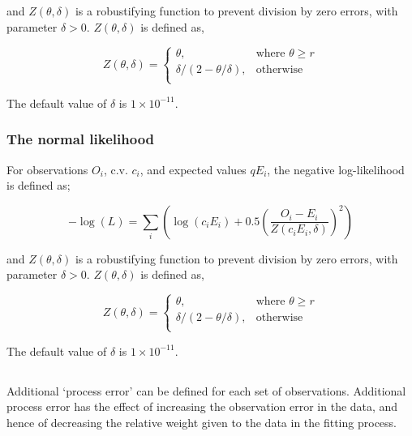 {{and $Z \left(\theta,\delta \right)$ is a robustifying function to prevent division by zero errors, with parameter $\delta>0$. $Z \left(\theta,\delta \right)$ is defined as,

\begin{equation}
   Z \left(\theta,\delta \right) = \begin{cases}
	  \theta, & \text{where $\theta \ge r$} \\
	  \delta/\left( 2-\theta/\delta \right), & \text{otherwise} \\  
  \end{cases}
\end{equation}

The default value of $\delta$ is $1 \times 10^{-11}$.

\subsubsection*{The normal likelihood}

For observations $O_i$, c.v. $c_i$, and expected values $qE_i$, the negative log-likelihood is defined as;

\begin{equation}
 - \log \left(L \right) = \sum\limits_i \left( \log \left( c_i E_i \right) +0.5 \left( \frac{O_i-E_i}{Z\left(c_i E_i,\delta \right)}\right)^2\right)
\end{equation}

and $Z \left(\theta,\delta \right)$ is a robustifying function to prevent division by zero errors, with parameter $\delta>0$. $Z \left(\theta,\delta \right)$ is defined as,

\begin{equation}
   Z \left(\theta,\delta \right) = \begin{cases}
	  \theta, & \text{where $\theta \ge r$} \\
	  \delta/\left( 2-\theta/\delta \right), & \text{otherwise} \\  
  \end{cases}
\end{equation}

The default value of $\delta$ is $1 \times 10^{-11}$.

\subsection{}

Additional `process error' can be defined for each set of observations. Additional process error has the effect of increasing the observation error in the data, and hence of decreasing the relative weight given to the data in the fitting process. 

}}
